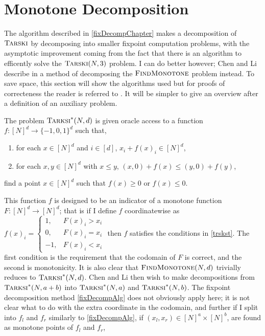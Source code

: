 \section{Monotone Decomposition} \label{monotoneDecompChap}
The algorithm described in \cref{fixDecompChapter} makes a decomposition
of $\textsc{Tarski}$ by decomposing into smaller fixpoint computation problems, with
the asymptotic improvement coming from the fact that there is an algorithm
to efficently solve the $\textsc{Tarski}(N, 3)$ problem. I can do better however;
Chen and Li describe in \citep{chenLi} a method of decomposing the $\textsc{FindMonotone}$
problem instead. To save space, this section will show the algorithms used
but for proofs of correcteness the reader is referred to \citep{chenLi}.
It will be simpler to give an overview after a definition of 
an auxiliary problem.
\newcommand{\trskst}{\textsc{Tarksi}^*}
\begin{definition}[$\trskst$, \citep{chenLi}] \label{trskst}
  The problem $\trskst(N, d)$ is given oracle access to a function $f : [N]^d \to \{-1, 0, 1\}^d$
  such that,
  \begin{enumerate}
    \item for each $x \in [N]^d$ and $i \in [d]$, $x_i + f(x)_i \in [N]^d$,
    \item for each $x, y \in [N]^d$ with $x \leq y$, $(x, 0) + f(x) \leq (y, 0) + f(y)$,
  \end{enumerate}
  find a point $x \in [N]^d$ such that $f(x) \geq 0$ or $f(x) \leq 0$.
\end{definition}
This function $f$ is designed to be an indicator of a monotone function $F : [N]^d \to [N]^d$;
that is if I define $f$ coordinatewise as 
$f(x)_i = \begin{cases} 1, & F(x)_i > x_i \\ 0, & F(x)_i = x_i \\ -1, & F(x)_i < x_i \end{cases}$
then $f$ satisfies the conditions in \cref{trskst}. The first condition is the requirement that
the codomain of $F$ is correct, and the second is monotonicity. It is also clear that $\textsc{FindMonotone}(N, d)$ 
trivially reduces to $\trskst(N, d)$. Chen and Li then wish to make decompositions from
$\trskst(N, a + b)$ into $\trskst(N, a)$ and $\trskst(N, b)$. The fixpoint decomposition
method \cref{fixDecompAlg} does not obviously apply here; it is not clear what to do with the extra
coordinate in the codomain, and further if I split into $f_l$ and $f_r$ similarly to \cref{fixDecompAlg},
if $(x_l, x_r) \in [N]^a \times [N]^b$, are found as monotone points of $f_l$ and $f_r$,
